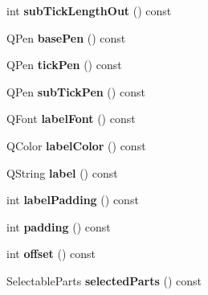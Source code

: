 \begin{DoxyCompactItemize}
\item 
\hypertarget{classQCPAxis_a091fdf8d1b3f9660e38b854578efb9bc}{int {\bfseries sub\-Tick\-Length\-Out} () const }\label{classQCPAxis_a091fdf8d1b3f9660e38b854578efb9bc}

\item 
\hypertarget{classQCPAxis_a4f6a7cd46fb104b1dad93e29cc78fe74}{\-Q\-Pen {\bfseries base\-Pen} () const }\label{classQCPAxis_a4f6a7cd46fb104b1dad93e29cc78fe74}

\item 
\hypertarget{classQCPAxis_a5eb206da4265c6c083db71d692da3bc4}{\-Q\-Pen {\bfseries tick\-Pen} () const }\label{classQCPAxis_a5eb206da4265c6c083db71d692da3bc4}

\item 
\hypertarget{classQCPAxis_a2e8bce6dd03e393dbdf6bb427461a726}{\-Q\-Pen {\bfseries sub\-Tick\-Pen} () const }\label{classQCPAxis_a2e8bce6dd03e393dbdf6bb427461a726}

\item 
\hypertarget{classQCPAxis_ae8029ae0b32e9d4d73dddcdd0a08c838}{\-Q\-Font {\bfseries label\-Font} () const }\label{classQCPAxis_ae8029ae0b32e9d4d73dddcdd0a08c838}

\item 
\hypertarget{classQCPAxis_a7854c2875e3b8d86b210d108bd87aeb9}{\-Q\-Color {\bfseries label\-Color} () const }\label{classQCPAxis_a7854c2875e3b8d86b210d108bd87aeb9}

\item 
\hypertarget{classQCPAxis_ab3486dca5a6e9e3ca0e32678272ba549}{\-Q\-String {\bfseries label} () const }\label{classQCPAxis_ab3486dca5a6e9e3ca0e32678272ba549}

\item 
\hypertarget{classQCPAxis_a59c9a0e362dec811491fc9a0709d2afa}{int {\bfseries label\-Padding} () const }\label{classQCPAxis_a59c9a0e362dec811491fc9a0709d2afa}

\item 
\hypertarget{classQCPAxis_abb85015a9467ec176e70698307ec833a}{int {\bfseries padding} () const }\label{classQCPAxis_abb85015a9467ec176e70698307ec833a}

\item 
\hypertarget{classQCPAxis_aebc032ac6eea164a02859c017f52d5e7}{int {\bfseries offset} () const }\label{classQCPAxis_aebc032ac6eea164a02859c017f52d5e7}

\item 
\hypertarget{classQCPAxis_a08323248a1cba4750ef07ceea159e0b3}{\-Selectable\-Parts {\bfseries selected\-Parts} () const }\label{classQCPAxis_a08323248a1cba4750ef07ceea159e0b3}


\end{DoxyCompactItemize}
